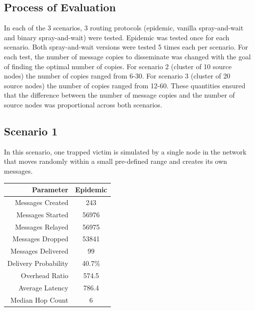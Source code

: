 \documentclass{article}
\begin{document}
\subsection{Process of Evaluation}
In each of the 3 scenarios, 3 routing protocols (epidemic, vanilla spray-and-wait and binary spray-and-wait) were tested. Epidemic was tested once for each scenario. Both spray-and-wait versions were tested 5 times each per scenario. For each test, the number of message copies to disseminate was changed with the goal of finding the optimal number of copies. For scenario 2 (cluster of 10 source nodes) the number of copies ranged from 6-30. For scenario 3 (cluster of 20 source nodes) the number of copies ranged from 12-60. These quantities ensured that the difference between the number of message copies and the number of source nodes was proportional across both scenarios.

\newpage

\subsection{Scenario 1}
In this scenario, one trapped victim is simulated by a single node in the network that moves randomly within a small pre-defined range and creates its own messages.

\begin{center}
\vspace{6px}
\begin{tabular}{|r|c|}
\hline
\textbf{Parameter} & \textbf{Epidemic} \\ \hline
Messages Created & 243 \\ \hline
Messages Started & 56976 \\ \hline
Messages Relayed & 56975 \\ \hline
Messages Dropped & 53841 \\ \hline
Messages Delivered & 99 \\ \hline
Delivery Probability & 40.7\%\\ \hline
Overhead Ratio & 574.5 \\ \hline
Average Latency & 786.4 \\ \hline
Median Hop Count & 6 \\ \hline
\end{tabular}
\end{center}
\end{document}
